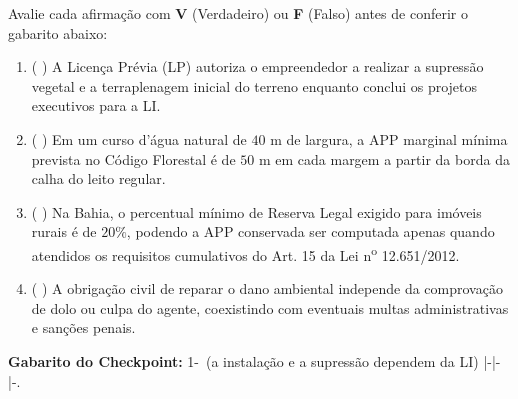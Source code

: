 \begin{boxTeste}
Avalie cada afirmação com \textbf{V} (Verdadeiro) ou \textbf{F} (Falso) antes de conferir o gabarito abaixo:
\begin{enumerate}[leftmargin=1.6em, itemsep=3pt]
  \item ( \quad ) A Licença Prévia (LP) autoriza o empreendedor a realizar a supressão vegetal e a terraplenagem inicial do terreno enquanto conclui os projetos executivos para a LI.
  \item ( \quad ) Em um curso d'água natural de $40\text{ m}$ de largura, a APP marginal mínima prevista no Código Florestal é de $50\text{ m}$ em cada margem a partir da borda da calha do leito regular.
  \item ( \quad ) Na Bahia, o percentual mínimo de Reserva Legal exigido para imóveis rurais é de $20\%$, podendo a APP conservada ser computada apenas quando atendidos os requisitos cumulativos do Art. 15 da Lei n\textsuperscript{o} 12.651/2012.
  \item ( \quad ) A obrigação civil de reparar o dano ambiental independe da comprovação de dolo ou culpa do agente, coexistindo com eventuais multas administrativas e sanções penais.
\end{enumerate}
\vspace{4pt}
{\footnotesize\textbf{Gabarito do Checkpoint:} 1-\F\ (a instalação e a supressão dependem da LI) \quad|-\V \quad|-\V \quad|-\V.}
\end{boxTeste}
